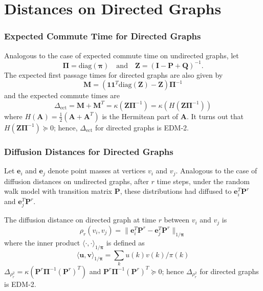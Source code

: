 \documentclass[professionalfonts, hyperref={pdfpagelabels=false,
  colorlinks=true, linkcolor=purple}]{beamer}
\begin{document}
\section{Distances on Directed Graphs}
\begin{frame}
  \frametitle{Expected Commute Time for Directed Graphs}
  Analogous to the case of expected commute time on undirected graphs,
  let 
  \begin{equation*}
    \bm{\Pi} = \mathrm{diag}(\bm{\pi}) \quad \text{and} \quad
    \mathbf{Z} = (\mathbf{I} - \mathbf{P} + \mathbf{Q})^{-1}.
  \end{equation*}
  The expected first passage times for directed graphs are also given by
  \begin{equation*}
    \mathbf{M} = (\mathbf{1}\mathbf{1}^{T}\mathrm{diag}(\mathbf{Z}) -
    \mathbf{Z})\bm{\Pi}^{-1} 
  \end{equation*}
  and the expected commute times are
  \begin{equation*}
    \Delta_{\mathrm{ect}} = \mathbf{M} + \mathbf{M}^{T} =
    \kappa(\mathbf{Z}\bm{\Pi}^{-1}) =
    \kappa(H(\mathbf{Z}\bm{\Pi}^{-1}))
  \end{equation*}
  where $H(\mathbf{A}) = \tfrac{1}{2}(\mathbf{A} + \mathbf{A}^{T})$ is
  the Hermitean part of $\mathbf{A}$.
  \vskip10pt
  It turns out that $H(\mathbf{Z}\bm{\Pi}^{-1}) \succeq 0$; hence,
  \vskip10pt \alert{$\Delta_{\mathrm{ect}}$ for directed graphs is
    EDM-2.}
\end{frame}

\begin{frame}
  \frametitle{Diffusion Distances for Directed Graphs}
  Let $\bm{e}_i$ and $\bm{e}_j$ denote point masses at vertices $v_i$ and
  $v_j$. Analogous to the case of diffusion distances on undirected
  graphs, after $r$ time steps, under the random walk model with
  transition matrix $\mathbf{P}$, these distributions had diffused to
  $\bm{e}_i^{T} \mathbf{P}^{r}$ and $\bm{e}_j^{T}\mathbf{P}^{r}$. 
  
  \vskip10pt 
  The diffusion distance on directed graph at
  time $r$ between $v_i$ and $v_j$ is
  \begin{equation*}
    \rho_{r}(v_i,v_j) = \| \bm{e}_i^{T} \mathbf{P}^{r} -
    \bm{e}_j^{T}
    \mathbf{P}^{r} \|_{1/\bm{\pi}}
  \end{equation*}
  where the inner product $\langle \cdot, \cdot
  \rangle_{1/\bm{\pi}}$ is defined as
  \begin{equation*}
    \langle \bm{u}, \bm{v} \rangle_{1/\bm{\pi}} = \sum_{k} u(k)
    v(k)/\pi(k)
  \end{equation*}
  $\Delta_{\rho_{r}^{2}} =
  \kappa(\mathbf{P}^{r}\bm{\Pi}^{-1}(\mathbf{P}^{r})^{T})$ and
  $\mathbf{P}^{r}\bm{\Pi}^{-1}(\mathbf{P}^{r})^{T} \succeq 0$; hence
  \vskip10pt \alert{$\Delta_{\rho_{r}^{2}}$ for directed graphs is EDM-2.}
\end{frame}
\end{document}
